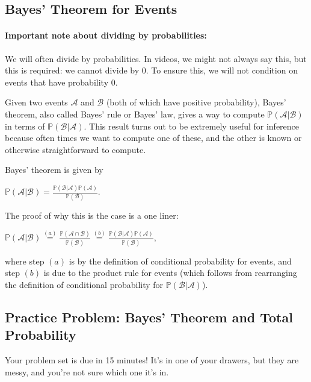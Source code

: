\documentclass[6008notes.tex]{subfiles}
\begin{document}
\subsection{Bayes' Theorem for Events}

\paragraph{Important note about dividing by probabilities:} We will often divide by probabilities. In videos, we might not always say this, but this is required: we cannot divide by 0. To ensure this, we will not condition on events that have probability 0.

Given two events $\mathcal{A}$ and $\mathcal{B}$ (both of which have positive probability), Bayes' theorem, also called Bayes' rule or Bayes' law, gives a way to compute $\mathbb {P}(\mathcal{A} | \mathcal{B})$ in terms of $\mathbb {P}(\mathcal{B} | \mathcal{A})$. This result turns out to be extremely useful for inference because often times we want to compute one of these, and the other is known or otherwise straightforward to compute.

Bayes' theorem is given by

{\centering$\mathbb {P}(\mathcal{A} | \mathcal{B}) = \frac{\mathbb {P}(\mathcal{B} | \mathcal{A}) \mathbb {P}(\mathcal{A})}{\mathbb {P}(\mathcal{B})}.$ \par}
 
The proof of why this is the case is a one liner:

{\centering$\mathbb {P}(\mathcal{A} | \mathcal{B}) \overset {(a)}{=} \frac{\mathbb {P}(\mathcal{A} \cap \mathcal{B})}{\mathbb {P}(\mathcal{B})} \overset {(b)}{=} \frac{\mathbb {P}(\mathcal{B} | \mathcal{A}) \mathbb {P}(\mathcal{A})}{\mathbb {P}(\mathcal{B})},$ \par}
 
where step $(a)$ is by the definition of conditional probability for events, and step $(b)$ is due to the product rule for events (which follows from rearranging the definition of conditional probability for $\mathbb {P}(\mathcal{B} | \mathcal{A})$).

\subsection{Practice Problem: Bayes' Theorem and Total Probability}

Your problem set is due in 15 minutes! It's in one of your drawers, but they are messy, and you're not sure which one it's in.
\end{document}
